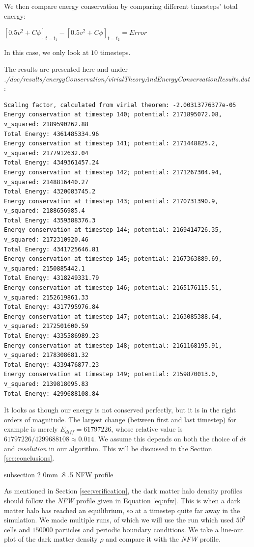 \documentclass[notitlepage, 12pt]{article}
\makeatletter
\renewcommand{\subsection}{\@startsection    %
        {subsection}
        {2}
        {0mm}
        {.8\baselineskip}
        {.5\baselineskip}
        {\bfseries\normalsize}}
\makeatother
\begin{document}
We then compare energy conservation by comparing different timesteps' total energy:

$[0.5v^2+C\phi]_{t=t_1} - [0.5v^2+C\phi]_{t=t_2} = Error$

In this case, we only look at $10$ timesteps.

The results are presented here and under \newline \emph{./doc/results/energyConservation/virialTheoryAndEnergyConservationResults.dat}:


\begin{verbatim}
Scaling factor, calculated from virial theorem: -2.00313776377e-05
Energy conservation at timestep 140; potential: 2171895072.08, v_squared: 2189590262.88
Total Energy: 4361485334.96
Energy conservation at timestep 141; potential: 2171448825.2, v_squared: 2177912632.04
Total Energy: 4349361457.24
Energy conservation at timestep 142; potential: 2171267304.94, v_squared: 2148816440.27
Total Energy: 4320083745.2
Energy conservation at timestep 143; potential: 2170731390.9, v_squared: 2188656985.4
Total Energy: 4359388376.3
Energy conservation at timestep 144; potential: 2169414726.35, v_squared: 2172310920.46
Total Energy: 4341725646.81
Energy conservation at timestep 145; potential: 2167363889.69, v_squared: 2150885442.1
Total Energy: 4318249331.79
Energy conservation at timestep 146; potential: 2165176115.51, v_squared: 2152619861.33
Total Energy: 4317795976.84
Energy conservation at timestep 147; potential: 2163085388.64, v_squared: 2172501600.59
Total Energy: 4335586989.23
Energy conservation at timestep 148; potential: 2161168195.91, v_squared: 2178308681.32
Total Energy: 4339476877.23
Energy conservation at timestep 149; potential: 2159870013.0, v_squared: 2139818095.83
Total Energy: 4299688108.84
\end{verbatim}

It looks as though our energy is not conserved perfectly, but it is in the right orders of magnitude. The largest change (between first and last timestep) for 
example is merely $E_{diff}=61797226$, whose relative value is $61797226/4299688108 \approx 0.014$. We assume this depends on both the choice of $dt$ and 
\emph{resolution} in our algorithm. This will be discussed in the Section \ref{sec:conclusions}.

\subsection{NFW profile}

As mentioned in Section \ref{sec:verification}, the dark matter halo density profiles should follow the \emph{NFW} profile given in Equation \ref{eq:nfw}. 
This is when a dark matter halo has reached an equilibrium, so at a timestep quite far away in the simulation. We made multiple runs, of which we will use 
the run which used $50^3$ cells and $150000$ particles and periodic boundary conditions. We take a line-out plot of the dark matter density $\rho$ and 
compare it with the \emph{NFW} profile.
\end{document}
